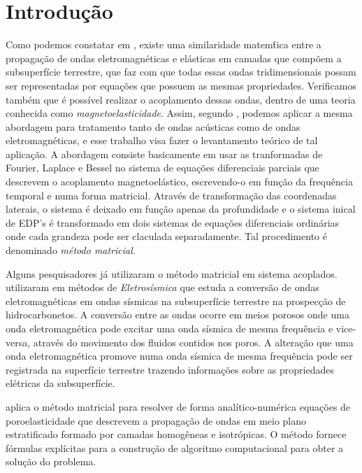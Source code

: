 \chapter{Introdu\c{c}\~ao}
Como podemos constatar em \cite{eringen_1963}, existe uma similaridade matem\'tica entre a propaga\c{c}\~ao de ondas eletromagn\'eticas e el\'asticas em camadas que comp\~oem a subsuperf\'icie terrestre, que faz com que todas essas ondas tridimensionais possam ser representadas por equa\c{c}\~oes que possuem as mesmas propriedades. Verificamos tamb\'em que \'e poss\'ivel realizar o acoplamento dessas ondas, dentro de uma teoria conhecida como \textit{magnetoelasticidade}. Assim, segundo \cite{Ursin-1983}, podemos aplicar a mesma abordagem para tratamento tanto de ondas ac\'usticas como de ondas eletromagn\'eticas, e esse trabalho visa fazer o levantamento te\'orico de tal aplica\c{c}\~ao. A abordagem consiste basicamente em usar as tranformadas de Fourier, Laplace e Bessel no sistema de equa\c{c}\~oes diferenciais parciais que descrevem o acoplamento magnetoel\'astico, escrevendo-o em fun\c{c}\~ao da frequ\^encia temporal e numa forma matricial. Atrav\'es de transforma\c{c}\~ao das coordenadas laterais, o sistema \'e deixado em fun\c{c}\~ao apenas da profundidade e o sistema inical de EDP's \'e transformado em dois sistemas de equa\c{c}\~oes diferenciais ordin\'arias onde cada grandeza pode ser claculada separadamente. Tal procedimento \'e denominado \textit{m\'etodo matricial}.

Alguns pesquisadores j\'a utilizaram o m\'etodo matricial em sistema acoplados. \cite{White_Zhou_2006} utilizaram em m\'etodos de \textit{Eletros\'ismica} que estuda a convers\~ao de ondas eletromagn\'eticas em ondas s\'ismicas na subsuperf\'icie terrestre na prospec\c{c}\~ao de hidrocarbonetos. A convers\~ao entre as ondas ocorre em meios porosos onde uma onda eletromagn\'etica pode excitar uma onda s\'ismica de mesma frequ\^encia e vice-versa, atrav\'es do movimento dos fluidos contidos nos poros. A altera\c{c}\~ao que uma onda eletromagn\'etica promove numa onda s\'ismica de mesma frequ\^encia pode ser registrada na superf\'icie terrestre trazendo informa\c{c}\~oes sobre as propriedades el\'etricas da subsuperf\'icie. 

\cite{Azeredo_2013} aplica o m\'etodo matricial para resolver de forma anal\'itico-num\'erica equa\c{c}\~oes de poroelasticidade que descrevem a propaga\c{c}\~ao de ondas em meio plano estratificado formado por camadas homog\^eneas e isotr\'opicas. O m\'etodo fornece f\'ormulas expl\'icitas para a constru\c{c}\~ao de algoritmo computacional  para obter a solu\c{c}\~ao do problema.